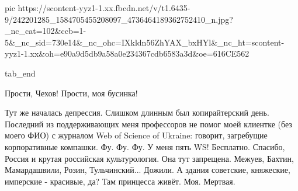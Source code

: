      pic https://scontent-yyz1-1.xx.fbcdn.net/v/t1.6435-9/242201285_1584705455208097_4736464189362752410_n.jpg?_nc_cat=102&ccb=1-5&_nc_sid=730e14&_nc_ohc=IXkldn56ZhYAX_bxHYl&_nc_ht=scontent-yyz1-1.xx&oh=e90a9d5db9a58a0e234367cdb6583a3d&oe=616CE562

  tab_end
\fi

Прости, Чехов! Прости, моя бусинка!

Тут же началась депрессия. Слишком длинным был копирайтерский день. Последний
из поддерживающих меня профессоров не помог моей клиентке (без моего ФИО) с
журналом Web of Science of Ukraine: говорит, загребущие корпоративные компашки.
Фу. Фу. Фу. У меня пять WS! Бесплатно. Спасибо, Россия и крутая российская
культурология. Она тут запрещена. Межуев, Бахтин, Мамардашвили, Розин,
Тульчинский... Дожили. А здания советские, княжеские, имперские - красивые, да?
Там принцесса живёт. Моя. Мертвая.
